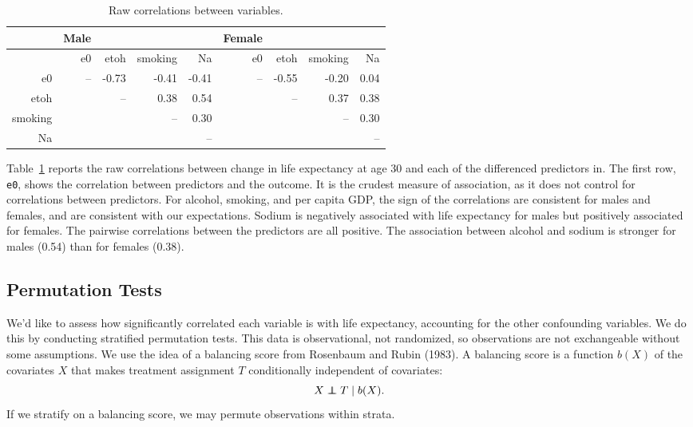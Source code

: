 \documentclass[11pt]{article}\usepackage[]{graphicx}\usepackage[]{color}
\newcommand\independent{\protect\mathpalette{\protect\independenT}{\perp}}
\def\independenT#1#2{\mathrel{\rlap{$#1#2$}\mkern2mu{#1#2}}}
\begin{document}
\begin{table}[ht]
\centering
\begin{tabular}{r|rrrr|rrrr}
   \hline
 & Male &  &  &  & Female &  &  &  \\ 
   \hline
   & e0 & etoh & smoking & Na & e0 & etoh & smoking & Na \\ 
   \hline
e0 & -- & -0.73 & -0.41 & -0.41 & -- & -0.55 & -0.20 & 0.04 \\ 
  etoh &  & -- & 0.38 & 0.54 &  & -- & 0.37 & 0.38 \\ 
  smoking &  &  & -- & 0.30 &  &  & -- & 0.30 \\ 
  Na &  &  &  & -- &  &  &  & -- \\ 
   \hline
\end{tabular}
\caption{Raw correlations between variables.} 
\label{tab:raw_corr}
\end{table}

Table~\ref{tab:raw_corr} reports the raw correlations between change in life expectancy at age 30 and each of the differenced predictors in.
The first row, \texttt{e0}, shows the correlation between predictors and the outcome.
It is the crudest measure of association, as it does not control for correlations between predictors.
For alcohol, smoking, and per capita GDP, the sign of the correlations are consistent for males and females, and are consistent with our expectations.
Sodium is negatively associated with life expectancy for males but positively associated for females.
The pairwise correlations between the predictors are all positive.
The association between alcohol and sodium is stronger for males (0.54) 
than for females (0.38).

\subsection{Permutation Tests}
We'd like to assess how significantly correlated each variable is with life expectancy, accounting for the other confounding variables.
We do this by conducting stratified permutation tests.
This data is observational, not randomized, so observations are not exchangeable without some assumptions.
We use the idea of a balancing score from Rosenbaum and Rubin (1983).
A balancing score is a function $b(X)$ of the covariates $X$ that makes treatment assignment $T$ conditionally independent of covariates:
$$X \independent T \mid b(X).$$
If we stratify on a balancing score, we may permute observations within strata.
\end{document}
